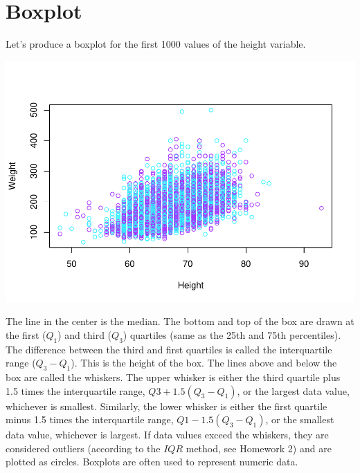 \documentclass[
]{book}
\newenvironment{Shaded}{\begin{snugshade}}{\end{snugshade}}
\newcommand{\DecValTok}[1]{\textcolor[rgb]{0.00,0.00,0.81}{#1}}
\newcommand{\KeywordTok}[1]{\textcolor[rgb]{0.13,0.29,0.53}{\textbf{#1}}}
\newcommand{\NormalTok}[1]{#1}
\newcommand{\OperatorTok}[1]{\textcolor[rgb]{0.81,0.36,0.00}{\textbf{#1}}}
\begin{document}
\hypertarget{boxplot}{%
\section{Boxplot}\label{boxplot}}

Let's produce a boxplot for the first 1000 values of the height variable.

\begin{Shaded}
\end{Shaded}

\includegraphics{_main_files/figure-latex/unnamed-chunk-230-1.pdf}

The line in the center is the median. The bottom and top of the box are drawn at the first (\(Q_1\)) and third (\(Q_3\)) quartiles (same as the 25th and 75th percentiles). The difference between the third and first quartiles is called the interquartile range (\(Q_3-Q_1\)). This is the height of the box. The lines above and below the box are called the whiskers. The upper whisker is either the third quartile plus 1.5 times the interquartile range, \(Q3 +1.5(Q_3-Q_1)\), or the largest data value, whichever is smallest. Similarly, the lower whisker is either the first quartile minus 1.5 times the interquartile range, \(Q1-1.5(Q_3-Q_1)\), or the smallest data value, whichever is largest. If data values exceed the whiskers, they are considered outliers (according to the \(IQR\) method, see Homework 2) and are plotted as circles. Boxplots are often used to represent numeric data.
\end{document}
